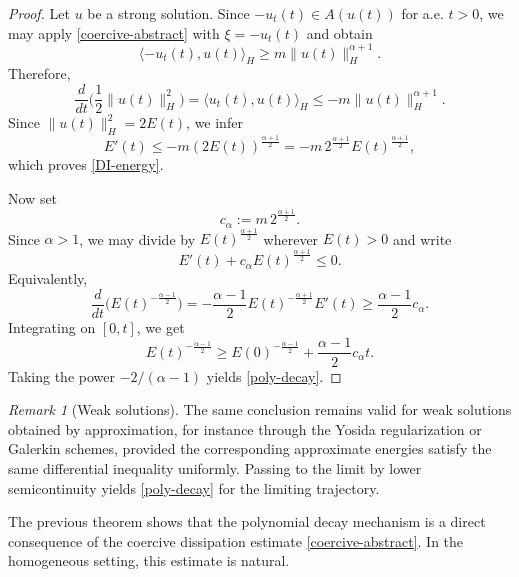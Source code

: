 \documentclass[11pt,reqno]{amsart}
\theoremstyle{remark}
\newtheorem{remark}[theorem]{Remark}
\begin{document}
\begin{proof}
Let $u$ be a strong solution. Since $-u_t(t)\in A(u(t))$ for a.e. $t>0$, we may apply
\eqref{coercive-abstract} with $\xi=-u_t(t)$ and obtain
\begin{equation}
\langle -u_t(t),u(t)\rangle_H \ge m\|u(t)\|_H^{\alpha+1}.
\end{equation}
Therefore,
\begin{equation}
\frac{d}{dt}\Big(\frac12\|u(t)\|_H^2\Big)
=\langle u_t(t),u(t)\rangle_H
\le -m\|u(t)\|_H^{\alpha+1}.
\end{equation}
Since $\|u(t)\|_H^2=2E(t)$, we infer
\begin{equation}
E'(t)\le -m(2E(t))^{\frac{\alpha+1}{2}}
=-m\,2^{\frac{\alpha+1}{2}}E(t)^{\frac{\alpha+1}{2}},
\end{equation}
which proves \eqref{DI-energy}.

Now set
\begin{equation}
c_\alpha:=m\,2^{\frac{\alpha+1}{2}}.
\end{equation}
Since $\alpha>1$, we may divide by $E(t)^{\frac{\alpha+1}{2}}$ wherever $E(t)>0$ and write
\begin{equation}
E'(t)+c_\alpha E(t)^{\frac{\alpha+1}{2}}\le 0.
\end{equation}
Equivalently,
\begin{equation}
\frac{d}{dt}\Big(E(t)^{-\frac{\alpha-1}{2}}\Big)
=
-\frac{\alpha-1}{2}E(t)^{-\frac{\alpha+1}{2}}E'(t)
\ge \frac{\alpha-1}{2}c_\alpha.
\end{equation}
Integrating on $[0,t]$, we get
\begin{equation}
E(t)^{-\frac{\alpha-1}{2}}
\ge
E(0)^{-\frac{\alpha-1}{2}}
+\frac{\alpha-1}{2}c_\alpha t.
\end{equation}
Taking the power $-2/(\alpha-1)$ yields \eqref{poly-decay}.
\end{proof}

\begin{remark}[Weak solutions]
The same conclusion remains valid for weak solutions obtained by approximation, for instance through
the Yosida regularization or Galerkin schemes, provided the corresponding approximate energies satisfy
the same differential inequality uniformly. Passing to the limit by lower semicontinuity yields
\eqref{poly-decay} for the limiting trajectory.
\end{remark}

The previous theorem shows that the polynomial decay mechanism is a direct consequence of the coercive
dissipation estimate \eqref{coercive-abstract}. In the homogeneous setting, this estimate is natural.
\end{document}
